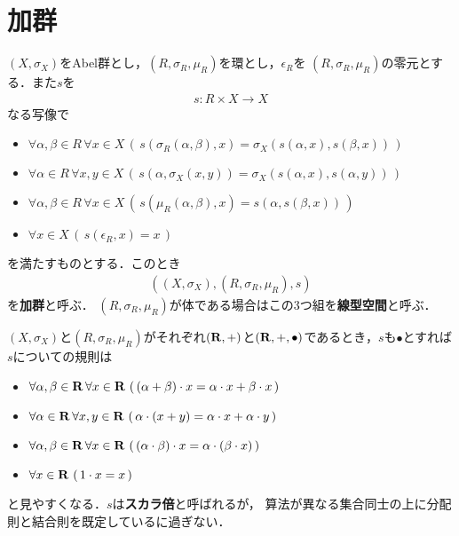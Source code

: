 \section{加群}
	\begin{screen}
		\begin{dfn}[加群]
			$(X,\sigma_X)$をAbel群とし，$(R,\sigma_R,\mu_R)$を環とし，$\epsilon_R$を
			$(R,\sigma_R,\mu_R)$の零元とする．また$s$を
			\begin{align}
				s:R \times X \longrightarrow X
			\end{align}
			なる写像で
			\begin{itemize}
				\item $\forall \alpha,\beta \in R\, \forall x \in X\, \left(\, s(\sigma_R(\alpha,\beta),x)
					= \sigma_X(s(\alpha,x),s(\beta,x))\, \right)$
				\item $\forall \alpha \in R\, \forall x,y \in X\, \left(\, s(\alpha,\sigma_X(x,y))
					= \sigma_X(s(\alpha,x),s(\alpha,y))\, \right)$
				\item $\forall \alpha,\beta \in R\, \forall x \in X\, \left(\, s(\mu_R(\alpha,\beta),x)
					= s(\alpha,s(\beta,x))\, \right)$
				\item $\forall x \in X\, \left(\, s(\epsilon_R,x) = x\, \right)$
			\end{itemize}
			を満たすものとする．このとき
			\begin{align}
				\left((X,\sigma_X),(R,\sigma_R,\mu_R),s\right)
			\end{align}
			を{\bf 加群}と呼ぶ．
			$(R,\sigma_R,\mu_R)$が体である場合はこの3つ組を{\bf 線型空間}と呼ぶ．
		\end{dfn}
	\end{screen}
	
	$(X,\sigma_X)$と$(R,\sigma_R,\mu_R)$がそれぞれ$(\mathbf{R},+)$と$(\mathbf{R},+,\bullet)$であるとき，$s$も$\bullet$とすれば
	$s$についての規則は
	\begin{itemize}
		\item $\forall \alpha,\beta \in \mathbf{R}\, \forall x \in \mathbf{R}\, \left(\, (\alpha + \beta) \cdot x
			= \alpha \cdot x + \beta \cdot x\, \right)$
		\item $\forall \alpha \in \mathbf{R}\, \forall x,y \in \mathbf{R}\, \left(\, \alpha \cdot (x+y)
			= \alpha \cdot x + \alpha \cdot y\, \right)$
		\item $\forall \alpha,\beta \in \mathbf{R}\, \forall x \in \mathbf{R}\, \left(\, (\alpha \cdot \beta) \cdot x
			= \alpha \cdot (\beta \cdot x)\, \right)$
		\item $\forall x \in \mathbf{R}\, \left(\, 1 \cdot x = x\, \right)$
	\end{itemize}
	と見やすくなる．$s$は{\bf スカラ倍}と呼ばれるが，
	算法が異なる集合同士の上に分配則と結合則を既定しているに過ぎない．